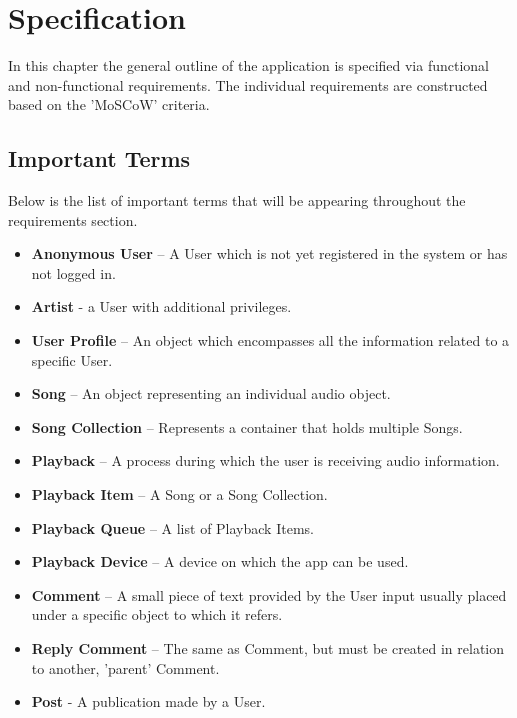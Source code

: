 \chapter{Specification}\label{chap:specification}

In this chapter the general outline of the application is specified via functional and non-functional requirements.
The individual requirements are constructed based on the 'MoSCoW' criteria\cite{moscow}.


\section{Important Terms}

Below is the list of important terms that will be appearing throughout the requirements section.

\begin{itemize}
    \item \textbf{Anonymous User} – A User which is not yet registered in the system or has not logged in.
    \item \textbf{Artist} - a User with additional privileges.
    \item \textbf{User Profile} – An object which encompasses all the information related to a specific User.
    \item \textbf{Song} – An object representing an individual audio object.
    \item \textbf{Song Collection} – Represents a container that holds multiple Songs.
    \item \textbf{Playback} – A process during which the user is receiving audio information.
    \item \textbf{Playback Item} – A Song or a Song Collection.
    \item \textbf{Playback Queue} – A list of Playback Items.
    \item \textbf{Playback Device} – A device on which the app can be used.
    \item \textbf{Comment} – A small piece of text provided by the User input usually placed under a specific object to which it refers.
    \item \textbf{Reply Comment} – The same as Comment, but must be created in relation to another, 'parent' Comment.
    \item \textbf{Post} - A publication made by a User.
\end{itemize}

\clearpage


